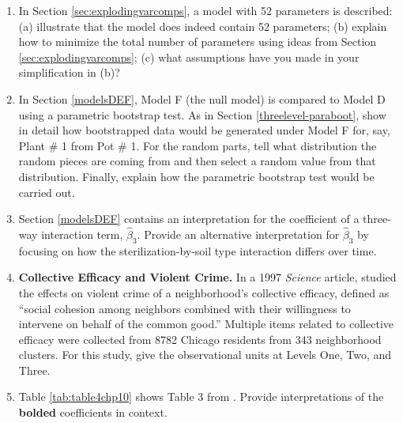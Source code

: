\documentclass[
]{krantz}
\begin{document}
\begin{enumerate}
\item
  In Section \ref{sec:explodingvarcomps}, a model with 52 parameters is described: (a) illustrate that the model does indeed contain 52 parameters; (b) explain how to minimize the total number of parameters using ideas from Section \ref{sec:explodingvarcomps}; (c) what assumptions have you made in your simplification in (b)?
\item
  In Section \ref{modelsDEF}, Model F (the null model) is compared to Model D using a parametric bootstrap test. As in Section \ref{threelevel-paraboot}, show in detail how bootstrapped data would be generated under Model F for, say, Plant \# 1 from Pot \# 1. For the random parts, tell what distribution the random pieces are coming from and then select a random value from that distribution. Finally, explain how the parametric bootstrap test would be carried out.
\item
  Section \ref{modelsDEF} contains an interpretation for the coefficient of a three-way interaction term, \(\hat{\beta}_{3}\). Provide an alternative interpretation for \(\hat{\beta}_{3}\) by focusing on how the sterilization-by-soil type interaction differs over time.
\item
  \textbf{Collective Efficacy and Violent Crime.} In a 1997 \emph{Science} article, \citet{Sampson1997} studied the effects on violent crime of a neighborhood's collective efficacy, defined as ``social cohesion among neighbors combined with their willingness to intervene on behalf of the common good.'' Multiple items related to collective efficacy were collected from 8782 Chicago residents from 343 neighborhood clusters. For this study, give the observational units at Levels One, Two, and Three.
\item
  Table \ref{tab:table4chp10} shows Table 3 from \citet{Sampson1997}. Provide interpretations of the \textbf{bolded} coefficients in context.
\end{enumerate}
\end{document}
